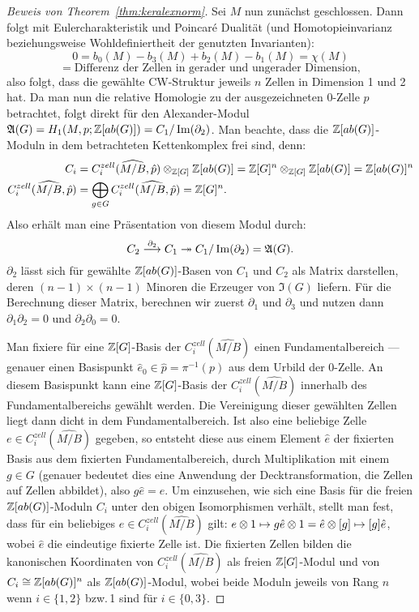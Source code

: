 \begin{proof}[Beweis von Theorem~\ref{thm:keralexnorm}]
	Sei $M$ nun zunächst geschlossen. Dann folgt mit Eulercharakteristik und Poincaré Dualität (und Homotopieinvarianz beziehungsweise Wohldefiniertheit der genutzten Invarianten):
	\[
		0=b_0(M)-b_3(M)+b_2(M)-b_1(M) = \chi(M) 
	\]
	\[
		= \text{Differenz der Zellen in gerader und ungerader Dimension},
	\]
	also folgt, dass die gewählte CW-Struktur jeweils $n$ Zellen in Dimension 1 und 2 hat. Da man nun die relative Homologie zu der ausgezeichneten $0$-Zelle $p$ betrachtet, folgt direkt für den Alexander-Modul $\mathfrak A(G)= H_1(M,p;\mathbb{Z}[ab(G)])=C_1/\operatorname{Im}(\partial _2)$. Man beachte, dass die $\mathbb{Z}[ab(G)]$-Moduln in dem betrachteten Kettenkomplex frei sind, denn: 
	\begin{align*}
		C_i &=C_i^{zell}(\widehat{M/B},\hat p)\otimes_{\mathbb{Z}[G]}\mathbb{Z}[ab(G)] = \mathbb{Z}[G]^n \otimes_{\mathbb{Z}[G]} \mathbb{Z}[ab(G)] = \mathbb{Z}[ab(G)]^n\\
		C_i^{zell}(\widehat{M/B},\hat p) &= \bigoplus_{g \in G} C_i^{zell}(\widehat{M/B},\hat p) = \mathbb{Z}[G]^n.
	\end{align*}
	Also erhält man eine Präsentation von diesem Modul durch:
	\[
		C_2 \stackrel {\partial_2} \longrightarrow C_1 \twoheadrightarrow C_1/\operatorname{Im}(\partial_2) = \mathfrak A(G).
	\]
	$\partial_2$ lässt sich für gewählte $\mathbb{Z}[ab(G)]$-Basen von $C_1$ und $C_2$ als Matrix darstellen, deren $(n-1)\times (n-1)$ Minoren die Erzeuger von $\mathfrak I(G)$ liefern. Für die Berechnung dieser Matrix, berechnen wir zuerst $\partial_1$ und $\partial_3$ und nutzen dann $\partial_1\partial_2=0$ und $\partial_2\partial_0=0$.

	Man fixiere für eine $\mathbb{Z}[G]$-Basis der $C^{zell}_i(\widehat{M/B})$ einen Fundamentalbereich --- genauer einen Basispunkt $\hat e_0 \in \hat p = \pi^{-1}(p)$ aus dem Urbild der 0-Zelle. An diesem Basispunkt kann eine $\mathbb{Z}[G]$-Basis der $C_i^{zell}(\widehat{ M/B})$ innerhalb des Fundamentalbereichs gewählt werden. Die Vereinigung dieser gewählten Zellen liegt dann dicht in dem Fundamentalbereich. Ist also eine beliebige Zelle $e \in C_i^{zell}(\widehat{ M/B})$ gegeben, so entsteht diese aus einem Element $\hat e$ der fixierten Basis aus dem fixierten Fundamentalbereich, durch Multiplikation mit einem $g\in G$ (genauer bedeutet dies eine Anwendung der Decktransformation, die Zellen auf Zellen abbildet), also $g\hat e = e$. Um einzusehen, wie sich eine Basis für die freien $\mathbb{Z}[ab(G)]$-Moduln $C_i$ unter den obigen Isomorphismen verhält, stellt man fest, dass für ein beliebiges $e\in C_i^{zell}(\widehat{ M/B})$ gilt: $e\otimes 1 \mapsto g\hat e \otimes 1 = \hat e \otimes [g] \mapsto [g]\hat e $, wobei $\hat e$ die eindeutige fixierte Zelle ist. Die fixierten Zellen bilden die kanonischen Koordinaten von $C_i^{zell}(\widehat{M/B})$ als freien $\mathbb{Z}[G]$-Modul und von $C_i \cong \mathbb{Z}[ab(G)]^n$ als $\mathbb{Z}[ab(G)]$-Modul, wobei beide Moduln jeweils von Rang $n$ wenn $i\in \{1,2\}$ bzw.\,1 sind für $i\in \{0,3\}$. 


\end{proof}
